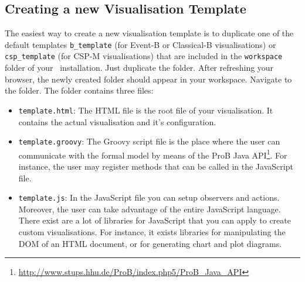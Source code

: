 \documentclass[twoside,10pt]{book}
\begin{document}
\subsection{Creating a new Visualisation Template}
\label{vis_template}

The easiest way to create a new visualisation template is to duplicate one of the default templates  \texttt{b\_template} (for Event-B or Classical-B visualisations) or \texttt{csp\_template} (for CSP-M visualisations) that are included in the \texttt{workspace} folder of your \bms~installation.
Just duplicate the folder.
After refreshing your browser, the newly created folder should appear in your workspace.
Navigate to the folder. 
The folder contains three files:
\begin{itemize}
\item \texttt{template.html}: The HTML file is the root file of your visualisation. It contains the actual visualisation and it's configuration.
\item \texttt{template.groovy}: The Groovy script file is the place where the user can communicate with the formal model by means of the ProB Java API\footnote{\url{http://www.stups.hhu.de/ProB/index.php5/ProB_Java_API}}.
For instance, the user may register methods that can be called in the JavaScript file.
\item \texttt{template.js}: In the JavaScript file you can setup observers and actions.
Moreover, the user can take advantage of the entire JavaScript language.
There exist are a lot of libraries for JavaScript that you can apply to create custom visualisations.
For instance, it exists libraries for manipulating the DOM of an HTML document, or for generating chart and plot diagrams.
\end{itemize}
\end{document}
